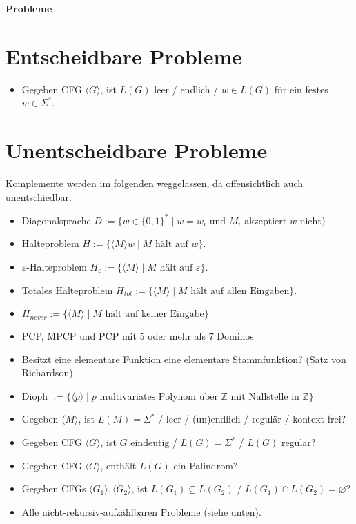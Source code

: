 \documentclass[a4paper,graphics,11pt]{article}
\newcommand{\eps}[0]{\varepsilon}
\newcommand{\godel}[1]{\langle #1 \rangle}
\begin{document}
\begin{center}
    \LARGE \textbf{Probleme}
\end{center}

\section*{Entscheidbare Probleme}
\begin{itemize}
    \item Gegeben CFG $\godel{G}$, ist $L(G)$ leer / endlich / $w \in L(G)$ für ein festes $w \in \Sigma^*$.
\end{itemize}

\section*{Unentscheidbare Probleme}

Komplemente werden im folgenden weggelassen, da offensichtlich auch unentschiedbar.
\begin{itemize}
    \item Diagonalsprache $D := \{w \in \{0,1\}^* \mid w = w_i \text{ und } M_i \text{ akzeptiert } w \text{ nicht}\}$
    \\
\item Halteproblem $H := \{\godel{M} w \mid M \text{ hält auf } w\}$.
\item $\eps$-Halteproblem $H_\eps := \{\godel{M} \mid M \text{ hält auf } \eps \}$.
    \item Totales Halteproblem $H_{tot} := \{\godel{M} \mid M \text{ hält auf allen Eingaben}\}$.
    \item $H_{never} := \{\godel{M} \mid M \text{ hält auf keiner Eingabe}\}$
    \\
    \item PCP, MPCP und PCP mit 5 oder mehr als 7 Dominos
    \\
    \item Besitzt eine elementare Funktion eine elementare Stammfunktion? (Satz von Richardson)
    \item Dioph $:= \{\godel{p} \mid p \text{ multivariates Polynom über $\mathbb{Z}$ mit Nullstelle in $\mathbb{Z}$}\}$
    \\
    \item Gegeben $\godel{M}$, ist $L(M) = \Sigma^*$  / leer / (un)endlich / regulär / kontext-frei?
    \item Gegeben CFG $\godel{G}$, ist $G$ eindeutig / $L(G) = \Sigma^*$ / $L(G)$ regulär?
    \item Gegeben CFG $\godel{G}$, enthält $L(G)$ ein Palindrom?
    \item Gegeben CFGs $\godel{G_1}, \godel{G_2}$, ist $L(G_1) \subseteq L(G_2)$ / $L(G_1) \cap L(G_2) = \varnothing$?
    \\
    \item Alle nicht-rekursiv-aufzählbaren Probleme (siehe unten).
\end{itemize}
\end{document}
